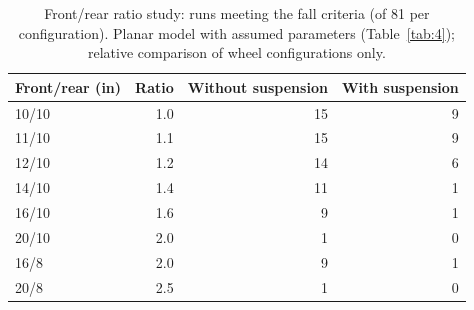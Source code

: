 \begin{table}[htbp]
\centering\small
\caption{Front/rear ratio study: runs meeting the fall criteria (of 81 per configuration). Planar model with assumed parameters (Table~\ref{tab:4}); relative comparison of wheel configurations only.}\label{tab:9}
\begin{tabular}{@{}lrrr@{}}
\toprule
Front/rear (in) & Ratio & Without suspension & With suspension \\
\midrule
10/10 & 1.0 & 15 & 9 \\
11/10 & 1.1 & 15 & 9 \\
12/10 & 1.2 & 14 & 6 \\
14/10 & 1.4 & 11 & 1 \\
16/10 & 1.6 & 9 & 1 \\
20/10 & 2.0 & 1 & 0 \\
16/8 & 2.0 & 9 & 1 \\
20/8 & 2.5 & 1 & 0 \\
\bottomrule
\end{tabular}
\end{table}
